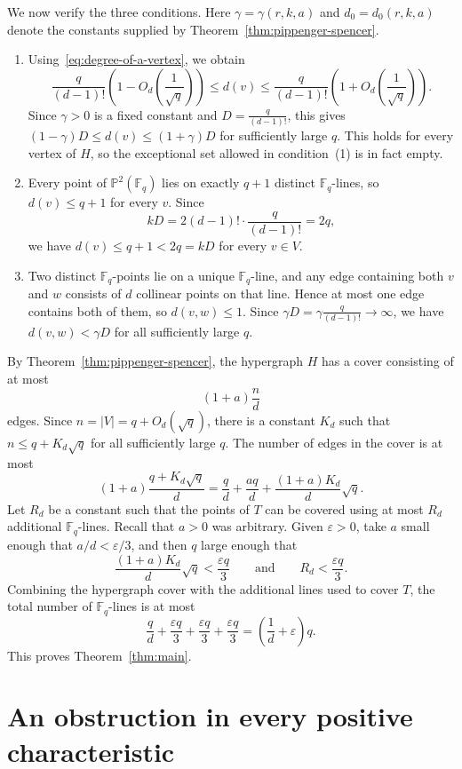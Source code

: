 \documentclass[10pt,a4paper]{amsart}
\theoremstyle{definition}
\theoremstyle{remark}
\newcommand{\Fq}{\mathbb{F}_q}
\newcommand{\bP}{\mathbb{P}}
\begin{document}
We now verify the three conditions. Here $\gamma=\gamma(r,k,a)$ and $d_0=d_0(r,k,a)$ denote the constants supplied by Theorem~\ref{thm:pippenger-spencer}.
\begin{enumerate}
    \item Using~\eqref{eq:degree-of-a-vertex}, we obtain
    \[
    \frac{q}{(d-1)!}\left(1-O_d\left(\frac{1}{\sqrt{q}}\right)\right)
    \leq d(v)\leq
    \frac{q}{(d-1)!}\left(1+O_d\left(\frac{1}{\sqrt{q}}\right)\right).
    \]
    Since $\gamma>0$ is a fixed constant and $D=\frac{q}{(d-1)!}$, this gives $(1-\gamma)D\leq d(v)\leq(1+\gamma)D$ for sufficiently large $q$. This holds for every vertex of $H$, so the exceptional set allowed in condition~(1) is in fact empty.
    \item Every point of $\bP^2(\Fq)$ lies on exactly $q+1$ distinct $\Fq$-lines, so $d(v)\leq q+1$ for every $v$. Since
    \[
    kD=2(d-1)!\cdot\frac{q}{(d-1)!}=2q,
    \]
    we have $d(v)\leq q+1<2q=kD$ for every $v\in V$.
    \item Two distinct $\Fq$-points lie on a unique $\Fq$-line, and any edge containing both $v$ and $w$ consists of $d$ collinear points on that line. Hence at most one edge contains both of them, so $d(v,w)\leq 1$. Since $\gamma D=\gamma\frac{q}{(d-1)!}\to\infty$, we have $d(v,w)<\gamma D$ for all sufficiently large $q$.
\end{enumerate}
By Theorem~\ref{thm:pippenger-spencer}, the hypergraph $H$ has a cover
consisting of at most
\[
(1+a)\frac{n}{d}
\]
edges. Since $n=|V|=q+O_d(\sqrt q)$, there is a constant $K_d$ such that $n\leq q+K_d\sqrt q$ for all sufficiently large $q$. The number of edges in the cover is at most
\[
(1+a)\frac{q+K_d\sqrt q}{d}
=
\frac{q}{d}+\frac{aq}{d}+\frac{(1+a)K_d}{d}\sqrt q.
\]
Let $R_d$ be a constant such that the points of $T$ can be covered using at most $R_d$ additional $\Fq$-lines. Recall that $a>0$ was arbitrary. Given $\varepsilon>0$, take $a$ small enough that $a/d<\varepsilon/3$, and then $q$ large enough that
\[
\frac{(1+a)K_d}{d}\sqrt q<\frac{\varepsilon q}{3}
\qquad\text{and}\qquad
R_d<\frac{\varepsilon q}{3}.
\]
Combining the hypergraph cover with the additional lines used to cover $T$, the total number of $\Fq$-lines is at most
\[
\frac{q}{d}+\frac{\varepsilon q}{3}+\frac{\varepsilon q}{3}+\frac{\varepsilon q}{3}
=
\left(\frac{1}{d}+\varepsilon\right)q.
\]
This proves Theorem~\ref{thm:main}.

\section{An obstruction in every positive characteristic}\label{sec:obstruction}
\end{document}
